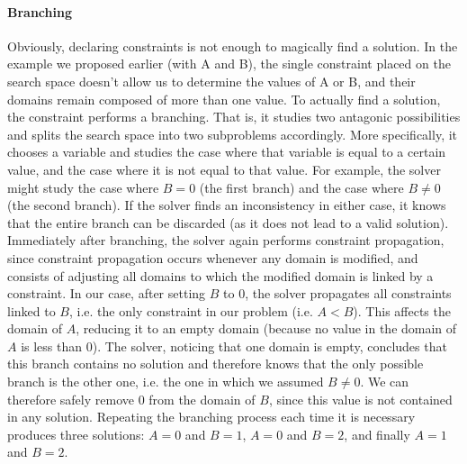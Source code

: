 \paragraph{Branching}
Obviously, declaring constraints is not enough to magically find a solution. In the example we proposed earlier (with A and B), the single constraint placed on the search space doesn't allow us to determine the values of A or B, and their domains remain composed of more than one value. 
To actually find a solution, the constraint performs a branching. That is, it studies two antagonic possibilities and splits the search space into two subproblems accordingly. More specifically, it chooses a variable and studies the case where that variable is equal to a certain value, and the case where it is not equal to that value. For example, the solver might study the case where $B=0$ (the first branch) and the case where $B \neq 0$ (the second branch). If the solver finds an inconsistency in either case, it knows that the entire branch can be discarded (as it does not lead to a valid solution). Immediately after branching, the solver again performs constraint propagation, since constraint propagation occurs whenever any domain is modified, and consists of adjusting all domains to which the modified domain is linked by a constraint. In our case, after setting $B$ to $0$, the solver propagates all constraints linked to $B$, i.e. the only constraint in our problem (i.e. $A<B$). This affects the domain of $A$, reducing it to an empty domain (because no value in the domain of $A$ is less than $0$). The solver, noticing that one domain is empty, concludes that this branch contains no solution and therefore knows that the only possible branch is the other one, i.e. the one in which we assumed $B\neq 0$. We can therefore safely remove $0$ from the domain of $B$, since this value is not contained in any solution. Repeating the branching process each time it is necessary produces three solutions: $A=0$ and $B=1$, $A=0$ and $B=2$, and finally $A=1$ and $B=2$.

